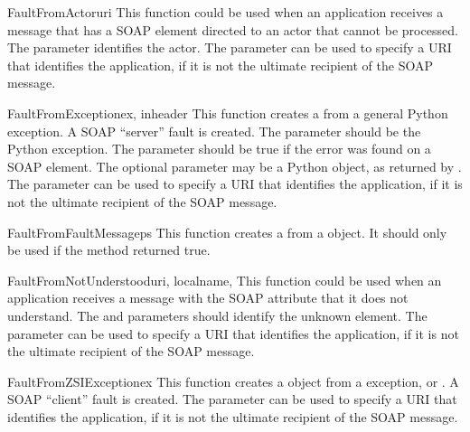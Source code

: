\begin{funcdesc}{FaultFromActor}{uri}
This function could be used when an application receives a message
that has a SOAP  element directed to an actor that
cannot be processed.
The  parameter identifies the actor.
The  parameter can be used to specify a URI that identifies the
application, if it is not the ultimate recipient of the SOAP message.
\end{funcdesc}

\begin{funcdesc}{FaultFromException}{ex, inheader}
This function creates a  from a general Python exception.
A SOAP ``server'' fault is created.
The  parameter should be the Python exception.
The  parameter should be true if the error was
found on a SOAP  element.
The optional  parameter may be a Python 
object, as returned by .
The  parameter can be used to specify a URI that identifies the
application, if it is not the ultimate recipient of the SOAP message.
\end{funcdesc}

\begin{funcdesc}{FaultFromFaultMessage}{ps}
This function creates a  from a  object.
It should only be used if the  method returned true.
\end{funcdesc}

\begin{funcdesc}{FaultFromNotUnderstood}{uri, localname,}
This function could be used when an application receives a message with
the SOAP  attribute that it does not understand.
The  and  parameters should identify
the unknown element.
The  parameter can be used to specify a URI that identifies the
application, if it is not the ultimate recipient of the SOAP message.
\end{funcdesc}

\begin{funcdesc}{FaultFromZSIException}{ex}
This function creates a  object from a \ZSI{} exception,
 or .
A SOAP ``client'' fault is created.
The  parameter can be used to specify a URI that identifies the
application, if it is not the ultimate recipient of the SOAP message.
\end{funcdesc}

